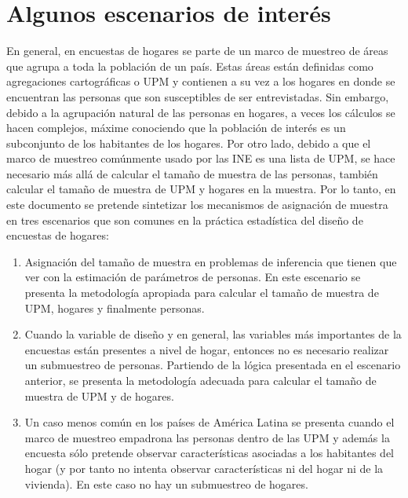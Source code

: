 \documentclass[
  12pt,
  spanish,
]{book}
\begin{document}
\hypertarget{algunos-escenarios-de-interuxe9s}{%
\section{Algunos escenarios de interés}\label{algunos-escenarios-de-interuxe9s}}

En general, en encuestas de hogares se parte de un marco de muestreo de áreas que agrupa a toda la población de un país. Estas áreas están definidas como agregaciones cartográficas o UPM y contienen a su vez a los hogares en donde se encuentran las personas que son susceptibles de ser entrevistadas. Sin embargo, debido a la agrupación natural de las personas en hogares, a veces los cálculos se hacen complejos, máxime conociendo que la población de interés es un subconjunto de los habitantes de los hogares. Por otro lado, debido a que el marco de muestreo comúnmente usado por las INE es una lista de UPM, se hace necesario más allá de calcular el tamaño de muestra de las personas, también calcular el tamaño de muestra de UPM y hogares en la muestra. Por lo tanto, en este documento se pretende sintetizar los mecanismos de asignación de muestra en tres escenarios que son comunes en la práctica estadística del diseño de encuestas de hogares:

\begin{enumerate}
\def\labelenumi{\arabic{enumi}.}
\item
  Asignación del tamaño de muestra en problemas de inferencia que tienen que ver con la estimación de parámetros de personas. En este escenario se presenta la metodología apropiada para calcular el tamaño de muestra de UPM, hogares y finalmente personas.
\item
  Cuando la variable de diseño y en general, las variables más importantes de la encuestas están presentes a nivel de hogar, entonces no es necesario realizar un submuestreo de personas. Partiendo de la lógica presentada en el escenario anterior, se presenta la metodología adecuada para calcular el tamaño de muestra de UPM y de hogares.
\item
  Un caso menos común en los países de América Latina se presenta cuando el marco de muestreo empadrona las personas dentro de las UPM y además la encuesta sólo pretende observar características asociadas a los habitantes del hogar (y por tanto no intenta observar características ni del hogar ni de la vivienda). En este caso no hay un submuestreo de hogares.
\end{enumerate}
\end{document}
